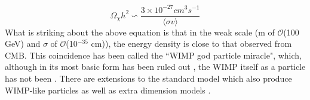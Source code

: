 \begin{equation}
    \Omega_\chi h^2 \backsim \frac{3\times 10^{-27} cm^3s^{-1}}{ \langle \sigma v \rangle}
\end{equation}
What is striking about the above equation is that in the weak scale (m of $\mathcal{O}$(100 GeV) and $\sigma$ of $\mathcal{O}$(10$^{-35}$ cm)), the energy density is close to that observed from CMB.
This coincidence has been called the ``WIMP god particle miracle", which, although in its most basic form has been ruled out \cite{less_of_a_wimp_miracle_ref}, the WIMP itself as a particle has not been \cite{wimp_theory_ref}.
There are extensions to the standard model which also produce WIMP-like particles \cite{supersymetry_wimpy_boi_ref,supersymetry_wimpy_again_ref} as well as extra dimension models \cite{extradimention_wimps_ref}.

